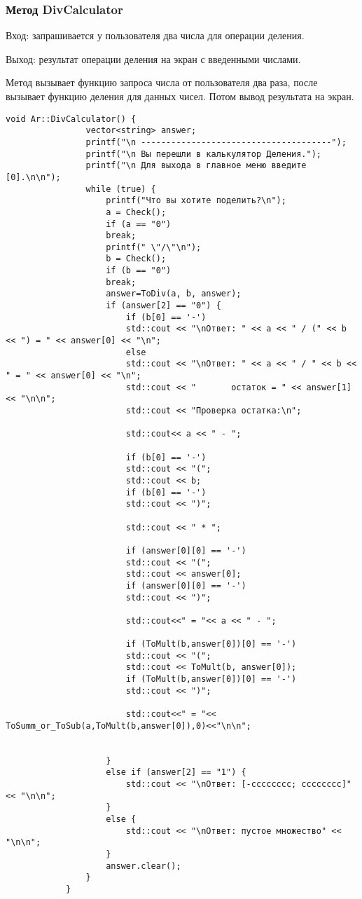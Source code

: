 \documentclass[10pt,a4paper,final]{article} %
\begin{document}
		
		\subsubsection{Метод DivCalculator}
		
		Вход: запрашивается у пользователя два числа для операции деления. 
		
		Выход: результат операции деления на экран с введенными числами.
		
		Метод вызывает функцию запроса числа от пользователя два раза, после вызывает функцию деления для данных чисел. Потом вывод результата на экран.  
		
		\begin{lstlisting}[caption={Метод DivCalculator}]
			void Ar::DivCalculator() {
				vector<string> answer;
				printf("\n --------------------------------------");
				printf("\n Вы перешли в калькулятор Деления.");
				printf("\n Для выхода в главное меню введите [0].\n\n");
				while (true) {
					printf("Что вы хотите поделить?\n");
					a = Check();
					if (a == "0")
					break;
					printf(" \"/\"\n");
					b = Check();
					if (b == "0")
					break;
					answer=ToDiv(a, b, answer);
					if (answer[2] == "0") {
						if (b[0] == '-')
						std::cout << "\nОтвет: " << a << " / (" << b << ") = " << answer[0] << "\n";
						else
						std::cout << "\nОтвет: " << a << " / " << b << " = " << answer[0] << "\n";
						std::cout << "       остаток = " << answer[1] << "\n\n";
						std::cout << "Проверка остатка:\n";
						
						std::cout<< a << " - ";
						
						if (b[0] == '-')
						std::cout << "(";
						std::cout << b;
						if (b[0] == '-')
						std::cout << ")";
						
						std::cout << " * ";
						
						if (answer[0][0] == '-')
						std::cout << "(";
						std::cout << answer[0];
						if (answer[0][0] == '-')
						std::cout << ")";
						
						std::cout<<" = "<< a << " - ";
						
						if (ToMult(b,answer[0])[0] == '-')
						std::cout << "(";
						std::cout << ToMult(b, answer[0]);
						if (ToMult(b,answer[0])[0] == '-')
						std::cout << ")";
						
						std::cout<<" = "<< ToSumm_or_ToSub(a,ToMult(b,answer[0]),0)<<"\n\n";
						
						
					}
					else if (answer[2] == "1") {
						std::cout << "\nОтвет: [-cccccccc; cccccccc]"  << "\n\n";
					}
					else {
						std::cout << "\nОтвет: пустое множество" << "\n\n";
					}
					answer.clear();
				}
			}
		\end{lstlisting}
		
\end{document}

